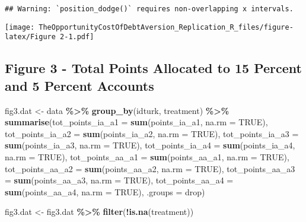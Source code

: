\documentclass[
]{article}
\newenvironment{Shaded}{\begin{snugshade}}{\end{snugshade}}
\newcommand{\AttributeTok}[1]{\textcolor[rgb]{0.13,0.29,0.53}{#1}}
\newcommand{\ConstantTok}[1]{\textcolor[rgb]{0.56,0.35,0.01}{#1}}
\newcommand{\FunctionTok}[1]{\textcolor[rgb]{0.13,0.29,0.53}{\textbf{#1}}}
\newcommand{\NormalTok}[1]{#1}
\newcommand{\OtherTok}[1]{\textcolor[rgb]{0.56,0.35,0.01}{#1}}
\newcommand{\SpecialCharTok}[1]{\textcolor[rgb]{0.81,0.36,0.00}{\textbf{#1}}}
\newcommand{\StringTok}[1]{\textcolor[rgb]{0.31,0.60,0.02}{#1}}
\begin{document}
\begin{verbatim}
## Warning: `position_dodge()` requires non-overlapping x intervals.
\end{verbatim}

\texttt{[image: TheOpportunityCostOfDebtAversion\_Replication\_R\_files/figure-latex/Figure 2-1.pdf]}

\subsection{Figure 3 - Total Points Allocated to 15 Percent and 5
Percent
Accounts}\label{figure-3---total-points-allocated-to-15-percent-and-5-percent-accounts}

\begin{Shaded}
\begin{Highlighting}[]
\NormalTok{fig3.dat }\OtherTok{\textless{}{-}}\NormalTok{ data }\SpecialCharTok{\%\textgreater{}\%}
  \FunctionTok{group\_by}\NormalTok{(idturk, treatment) }\SpecialCharTok{\%\textgreater{}\%}
  \FunctionTok{summarise}\NormalTok{(}\AttributeTok{tot\_points\_ia\_a1 =} \FunctionTok{sum}\NormalTok{(points\_ia\_a1, }\AttributeTok{na.rm =} \ConstantTok{TRUE}\NormalTok{),}
            \AttributeTok{tot\_points\_ia\_a2 =} \FunctionTok{sum}\NormalTok{(points\_ia\_a2, }\AttributeTok{na.rm =} \ConstantTok{TRUE}\NormalTok{),}
            \AttributeTok{tot\_points\_ia\_a3 =} \FunctionTok{sum}\NormalTok{(points\_ia\_a3, }\AttributeTok{na.rm =} \ConstantTok{TRUE}\NormalTok{),}
            \AttributeTok{tot\_points\_ia\_a4 =} \FunctionTok{sum}\NormalTok{(points\_ia\_a4, }\AttributeTok{na.rm =} \ConstantTok{TRUE}\NormalTok{),}
            \AttributeTok{tot\_points\_aa\_a1 =} \FunctionTok{sum}\NormalTok{(points\_aa\_a1, }\AttributeTok{na.rm =} \ConstantTok{TRUE}\NormalTok{),}
            \AttributeTok{tot\_points\_aa\_a2 =} \FunctionTok{sum}\NormalTok{(points\_aa\_a2, }\AttributeTok{na.rm =} \ConstantTok{TRUE}\NormalTok{),}
            \AttributeTok{tot\_points\_aa\_a3 =} \FunctionTok{sum}\NormalTok{(points\_aa\_a3, }\AttributeTok{na.rm =} \ConstantTok{TRUE}\NormalTok{),}
            \AttributeTok{tot\_points\_aa\_a4 =} \FunctionTok{sum}\NormalTok{(points\_aa\_a4, }\AttributeTok{na.rm =} \ConstantTok{TRUE}\NormalTok{),}
            \AttributeTok{.groups =} \StringTok{\textquotesingle{}drop\textquotesingle{}}\NormalTok{)}

\NormalTok{fig3.dat }\OtherTok{\textless{}{-}}\NormalTok{ fig3.dat }\SpecialCharTok{\%\textgreater{}\%} 
  \FunctionTok{filter}\NormalTok{(}\SpecialCharTok{!}\FunctionTok{is.na}\NormalTok{(treatment))}


\end{Highlighting}
\end{Shaded}
\end{document}
